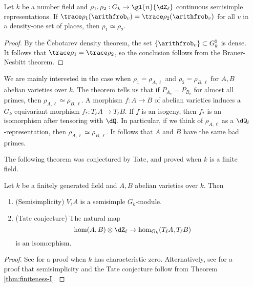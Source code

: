 \begin{theorem}\label{thm:trace-determines-rep}
Let $k$ be a number field and $\rho_1,\rho_2:G_k \to \gl{n}{\dZ_\ell}$ 
continuous semisimple representations. If 
$\trace \rho_1(\arithfrob_v) = \trace \rho_2(\arithfrob_v)$ for all $v$ in a density-one 
set of places, then $\rho_1\simeq \rho_2$. 
\end{theorem}
\begin{proof}
By the \v Cebotarev density theorem, the set $\{\arithfrob_v\}\subset G_k^\natural$ 
is dense. It follows that $\trace \rho_1 = \trace \rho_2$, so the conclusion 
follows from the Brauer-Nesbitt theorem. 
\end{proof}

We are mainly interested in the case when $\rho_1=\rho_{A,\ell}$ and 
$\rho_2=\rho_{B,\ell}$ for $A,B$ abelian varieties over $k$. The theorem tells 
us that if $P_{A_v} = P_{B_v}$ for almost all primes, then 
$\rho_{A,\ell}\simeq \rho_{B,\ell}$. A morphism $f:A\to B$ of abelian varieties 
induces a $G_k$-equivariant morphism $f_\ast:T_\ell A \to T_\ell B$. If $f$ is 
an isogeny, then $f_\ast$ is an isomorphism after tensoring with $\dQ$. In 
particular, if we think of $\rho_{A,\ell}$ as a $\dQ_\ell$-representation, then 
$\rho_{A,\ell}\simeq \rho_{B,\ell}$. It follows that $A$ and $B$ have the same 
bad primes. 

The following theorem was conjectured by Tate, and proved when $k$ is a finite 
field. 

\begin{theorem}[Faltings]
Let $k$ be a finitely generated field and $A,B$ abelian varieties over $k$. 
Then 
\begin{enumerate} %
  \item (Semisimplicity) $V_\ell A$ is a semisimple $G_k$-module. 
  \item (Tate conjecture) The natural map
    \[
      \hom(A,B)\otimes\dZ_\ell \to \hom_{G_k}(T_\ell A,T_\ell B)
    \]
    is an isomorphism. 
\end{enumerate}
\end{theorem}
\begin{proof}
See \cite{fa84} for a proof when $k$ has characteristic zero. Alternatively, 
see \cite[IV.2.5]{mi-av} for a proof that semisimplicity and the Tate 
conjecture follow from Theorem \ref{thm:finiteness-I}. 
\end{proof}

